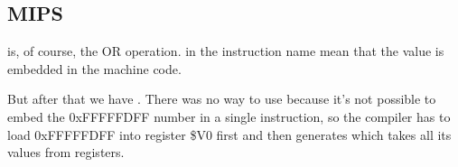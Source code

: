 ﻿\subsection{MIPS}




 is, of course, the OR operation.  in the instruction name mean that the value is embedded in the machine code.


But after that we have \AND. There was no way to use  because it's not possible to embed the 0xFFFFFDFF number
in a single instruction, so the compiler has to load 0xFFFFFDFF into register \$V0 first and then generates
\AND which takes all its values from registers.
